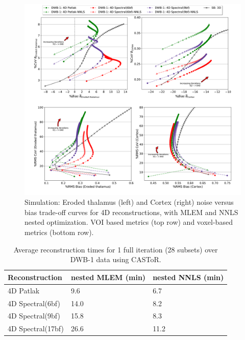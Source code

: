 \begin{figure} [ht!]
\centering
\includegraphics[scale=0.42,angle=0]{3_Results/3_2_Dynamic_Reconstruction_SimulationStudy/figures/VOI/3_3.pdf}
\caption{Simulation: Eroded thalamus (left) and Cortex (right) noise versus bias trade-off curves for 4D reconstructions, with MLEM and NNLS nested optimization. VOI based metrics (top row) and voxel-based metrics (bottom row).} 
\label{fig:3_3_DifferentNestedOptimization}
\end{figure} 

\begin{table}[h!]
\centering
\caption{\label{tab:ReconTimes}Average reconstruction times for 1 full iteration (28 subsets) over DWB-1 data using CASToR.}
\begin{tabular}{lll}
\toprule
\textbf{Reconstruction} & \textbf{nested MLEM (min)} & \textbf{nested NNLS (min)} \\ 
\midrule
4D Patlak               & 9.6  & 6.7  \\
4D Spectral(6bf)        & 14.0 & 8.2  \\   
4D Spectral(9bf)        & 15.8 & 8.3  \\ 
4D Spectral(17bf)       & 26.6 & 11.2 \\
\toprule
\end{tabular}
\end{table}

